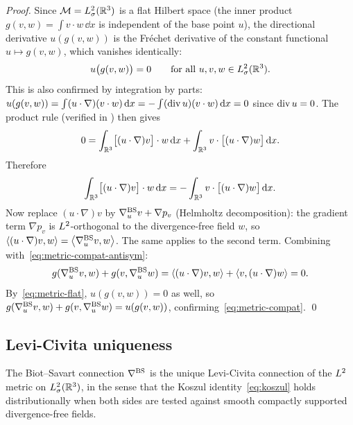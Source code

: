 \begin{proof}
  Since $\mathcal{M} = L^{2}_\sigma(\mathbb{R}^3)$ is a flat Hilbert space (the inner product
  $g(v,w) = \int v\cdot w\,\dd x$ is independent of the base point $u$), the
  directional derivative $u(g(v,w))$ is the Fr\'{e}chet derivative of the constant
  functional $u\mapsto g(v,w)$, which vanishes identically:
  \begin{equation}\label{eq:metric-flat}
    u\bigl(g(v,w)\bigr) = 0 \qquad \text{for all } u, v, w \in L^{2}_\sigma(\mathbb{R}^3).
  \end{equation}
  This is also confirmed by integration by parts: $u(g(v,w)) = \int(u\cdot\nabla)(v\cdot
  w)\,\mathrm{d} x = -\int(\operatorname{div} u)(v\cdot w)\,\mathrm{d} x = 0$ since $\operatorname{div} u = 0$.
  The product rule (verified in ) then gives
  \[
    0 = \int_{\mathbb{R}^3} \bigl[(u \cdot \nabla)v\bigr] \cdot w\,\mathrm{d} x
      + \int_{\mathbb{R}^3} v \cdot \bigl[(u \cdot \nabla)w\bigr]\,\mathrm{d} x.
  \]
  Therefore
  \begin{equation}\label{eq:metric-compat-antisym}
    \int_{\mathbb{R}^3} \bigl[(u \cdot \nabla)v\bigr] \cdot w\,\mathrm{d} x
    = -\int_{\mathbb{R}^3} v \cdot \bigl[(u \cdot \nabla)w\bigr]\,\mathrm{d} x.
  \end{equation}
  Now replace $(u \cdot \nabla)v$ by $\nabla^{\mathrm{BS}}_u v + \nabla p_v$ (Helmholtz decomposition):
  the gradient term $\nabla p_v$ is $L^{2}$-orthogonal to the divergence-free field $w$,
  so $\left\langle (u \cdot \nabla)v, w \right\rangle = \left\langle \nabla^{\mathrm{BS}}_u v, w \right\rangle$.  The same applies to the second
  term.  Combining with~\eqref{eq:metric-compat-antisym}:
  \[
    g(\nabla^{\mathrm{BS}}_u v, w) + g(v, \nabla^{\mathrm{BS}}_u w)
    = \left\langle (u \cdot \nabla)v, w \right\rangle + \left\langle v, (u \cdot \nabla)w \right\rangle
    = 0.
  \]
  By~\eqref{eq:metric-flat}, $u(g(v,w)) = 0$ as well, so
  $g(\nabla^{\mathrm{BS}}_u v, w) + g(v, \nabla^{\mathrm{BS}}_u w) = u(g(v,w))$, confirming~\eqref{eq:metric-compat}.
  \qed
\end{proof}

\subsection{Levi-Civita uniqueness}

\begin{theorem}\label{thm:levi-civita}
  The Biot--Savart connection $\nabla^{\mathrm{BS}}$ is the unique Levi-Civita connection of the
  $L^{2}$ metric on $L^{2}_\sigma(\mathbb{R}^3)$, in the sense that the Koszul
  identity~\eqref{eq:koszul} holds distributionally when both sides are tested against
  smooth compactly supported divergence-free fields.
\end{theorem}

